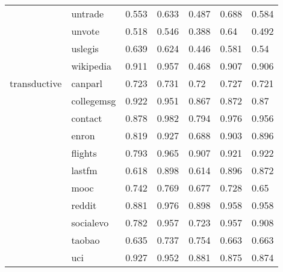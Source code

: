 \begin{tabular}{lllllll}
             & untrade &          0.553 &                 0.633 &                     0.487 &         0.688 &                    0.584 \\
             & unvote &          0.518 &                 0.546 &                     0.388 &          0.64 &                    0.492 \\
             & uslegis &          0.639 &                 0.624 &                     0.446 &         0.581 &                     0.54 \\
             & wikipedia &          0.911 &                 0.957 &                     0.468 &         0.907 &                    0.906 \\
transductive & canparl &          0.723 &                 0.731 &                      0.72 &         0.727 &                    0.721 \\
             & collegemsg &          0.922 &                 0.951 &                     0.867 &         0.872 &                     0.87 \\
             & contact &          0.878 &                 0.982 &                     0.794 &         0.976 &                    0.956 \\
             & enron &          0.819 &                 0.927 &                     0.688 &         0.903 &                    0.896 \\
             & flights &          0.793 &                 0.965 &                     0.907 &         0.921 &                    0.922 \\
             & lastfm &          0.618 &                 0.898 &                     0.614 &         0.896 &                    0.872 \\
             & mooc &          0.742 &                 0.769 &                     0.677 &         0.728 &                     0.65 \\
             & reddit &          0.881 &                 0.976 &                     0.898 &         0.958 &                    0.958 \\
             & socialevo &          0.782 &                 0.957 &                     0.723 &         0.957 &                    0.908 \\
             & taobao &          0.635 &                 0.737 &                     0.754 &         0.663 &                    0.663 \\
             & uci &          0.927 &                 0.952 &                     0.881 &         0.875 &                    0.874 \\

\end{tabular}
